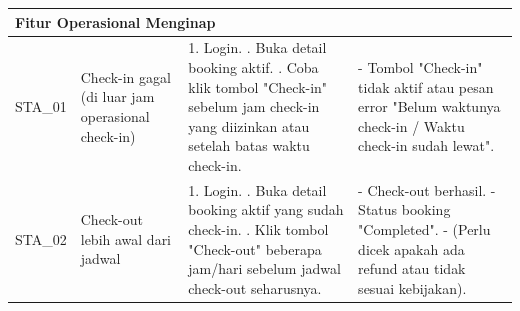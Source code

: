 \begin{longtable}{|m{2cm}|m{3.5cm}|m{4.5cm}|m{4.5cm}|}
    \multicolumn{4}{|l|}{\textbf{Fitur Operasional Menginap}}                                                                                                                                                                                                                                                                                                                                                                                                                                                                                                                                                                                                         \\
    \hline
    STA\_01                 & Check-in gagal (di luar jam operasional check-in)                       & 1. Login. \newline 2. Buka detail booking aktif. \newline 3. Coba klik tombol "Check-in" sebelum jam check-in yang diizinkan atau setelah batas waktu check-in.                                                                                                                                                                                                                        & - Tombol "Check-in" tidak aktif atau pesan error "Belum waktunya check-in / Waktu check-in sudah lewat".                                                             \\
    \hline
    STA\_02                 & Check-out lebih awal dari jadwal                                        & 1. Login. \newline 2. Buka detail booking aktif yang sudah check-in. \newline 3. Klik tombol "Check-out" beberapa jam/hari sebelum jadwal check-out seharusnya.                                                                                                                                                                                                                        & - Check-out berhasil. \newline - Status booking "Completed". \newline - (Perlu dicek apakah ada refund atau tidak sesuai kebijakan).                                 \\
    \hline


\end{longtable}
